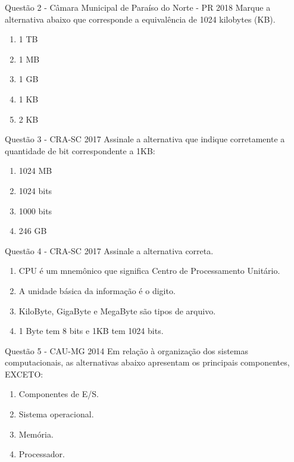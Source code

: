 \documentclass[aspectratio=169,
				xcolor=table]{beamer}
\begin{document}
	\begin{frame}{Questão 2 - Câmara Municipal de Paraíso do Norte - PR 2018}
		Marque a alternativa abaixo que corresponde a equivalência de 1024 kilobytes (KB).
		\begin{enumerate}[A]
			\item 1 TB
			\item 1 MB
			\item 1 GB
			\item 1 KB
			\item 2 KB
		\end{enumerate}
	\end{frame}

	\begin{frame}{Questão 3 - CRA-SC 2017}
		Assinale a alternativa que indique corretamente a quantidade de bit correspondente a 1KB: 
		\begin{enumerate}[A]
			\item 1024 MB 
			\item 1024 bits 
			\item 1000 bits 
			\item 246 GB 
		\end{enumerate}		
	\end{frame}
	
	\begin{frame}{Questão 4 - CRA-SC 2017}
		Assinale a alternativa correta. 
		\begin{enumerate}[A]
			\item CPU é um mnemônico que significa Centro de Processamento Unitário. 
			\item A unidade básica da informação é o digito.
			\item KiloByte, GigaByte e MegaByte são tipos de arquivo. 
			\item 1 Byte tem 8 bits e 1KB tem 1024 bits. 
		\end{enumerate}
	\end{frame}

	\begin{frame}{Questão 5 - CAU-MG 2014}
		Em relação à organização dos sistemas computacionais, as alternativas abaixo apresentam os principais componentes, EXCETO: 
		\begin{enumerate}[A]
			\item Componentes de E/S.
			\item Sistema operacional.
			\item Memória.
			\item Processador. 
		\end{enumerate}
	\end{frame}
	
\end{document}

